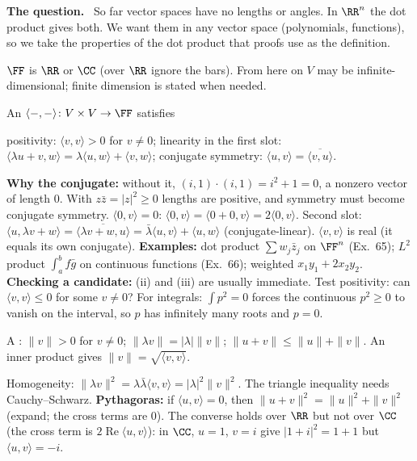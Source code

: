 \documentclass[10pt]{scrartcl}
\newcommand{\ip}[2]{\langle #1,#2\rangle}
\newenvironment{qbox}{\begin{mdframed}[style=qboxstyle]\textbf{The question.}\ }{\end{mdframed}}
\begin{document}
\begin{qbox}
  So far vector spaces have no lengths or angles. In $\RR^n$ the dot product gives both. We want them in any vector space (polynomials, functions), so we take the properties of the dot product that proofs use as the definition.
\end{qbox}

$\FF$ is $\RR$ or $\CC$ (over $\RR$ ignore the bars). From here on $V$ may be infinite-dimensional; finite dimension is stated when needed.

\begin{definition*}
  An  $\ip--\colon V\times V\to\FF$ satisfies
  \begin{enumerate}[(i)]
    \ii positivity: $\ip vv>0$ for $v\ne0$;
    \ii linearity in the first slot: $\ip{\lambda u+v}w=\lambda\ip uw+\ip vw$;
    \ii conjugate symmetry: $\ip uv=\overline{\ip vu}$.
  \end{enumerate}
\end{definition*}
\begin{itemize}
  \ii \textbf{Why the conjugate:} without it, $(i,1)\cdot(i,1)=i^2+1=0$, a nonzero vector of length $0$. With $z\bar z=|z|^2\ge0$ lengths are positive, and symmetry must become conjugate symmetry.
  \ii $\ip0v=0$: $\ip0v=\ip{0+0}v=2\ip0v$.
  \ii Second slot: $\ip u{\lambda v+w}=\overline{\ip{\lambda v+w}u}=\bar\lambda\ip uv+\ip uw$ (conjugate-linear).
  \ii $\ip vv$ is real (it equals its own conjugate).
  \ii \textbf{Examples:} dot product $\sum w_j\bar z_j$ on $\FF^n$ (Ex.~65); $L^2$ product $\int_a^bf\bar g$ on continuous functions (Ex.~66); weighted $x_1y_1+2x_2y_2$.
  \ii \textbf{Checking a candidate:} (ii) and (iii) are usually immediate. Test positivity: can $\ip vv\le0$ for some $v\ne0$? For integrals: $\int p^2=0$ forces the continuous $p^2\ge0$ to vanish on the interval, so $p$ has infinitely many roots and $p=0$.
\end{itemize}

\begin{definition*}
  A : $\|v\|>0$ for $v\ne0$; $\|\lambda v\|=|\lambda|\|v\|$; $\|u+v\|\le\|u\|+\|v\|$. An inner product gives $\|v\|=\sqrt{\ip vv}$.
\end{definition*}
\begin{itemize}
  \ii Homogeneity: $\|\lambda v\|^2=\lambda\bar\lambda\ip vv=|\lambda|^2\|v\|^2$. The triangle inequality needs Cauchy--Schwarz.
  \ii \textbf{Pythagoras:} if $\ip uv=0$, then $\|u+v\|^2=\|u\|^2+\|v\|^2$ (expand; the cross terms are $0$).
  \ii The converse holds over $\RR$ but not over $\CC$ (the cross term is $2\operatorname{Re}\ip uv$): in $\CC$, $u=1$, $v=i$ give $|1+i|^2=1+1$ but $\ip uv=-i$.
\end{itemize}
\end{document}
